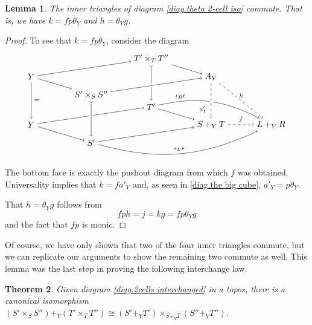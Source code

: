 \documentclass[11pt]{amsart}
\newtheorem{thm}{Theorem}[section]
\newtheorem{lem}[thm]{Lemma}
\theoremstyle{remark}
\theoremstyle{definition}
\begin{document}
\begin{lem}
	The inner triangles of diagram \eqref{diag.theta 2-cell iso} commute. That is, we have $k=fp \theta_Y$ and $h=\theta_Yg$.
\end{lem}
%
\begin{proof}
	To see that $k=fp\theta_Y$, consider the diagram
	\[
	\begin{tikzpicture}
		\node (Yt) at (0,2) {$Y$};
		\node (Yb) at (0,0) {$Y$};
		\node (Spb) at (2.5,1.25) {$S'\times_SS''$};
		\node (S') at (2.5,-0.75) {$S'$};
		\node (Tpb) at (5,2.75) {$T'\times_TT''$};
		\node (T') at (5,0.75) {$T'$};
		\node (Ay) at (7.5,2) {$A_Y$};
		\node (SyT) at (7.5,0) {$S+_YT$};
		\node (LyR) at (10,0) {$L+_YR$};
		\draw [->] (Yt) edge[] (Tpb);
		\draw [->] (Yt) edge[] (Spb);
		\draw [font=\scriptsize,->] (Yt) edge node[right] {$=$} (Yb);
		\draw [->] (Yb) edge[] (T');
		\draw [->] (Yb) edge[] (S');
		\draw [->] (Tpb) edge[] (Ay);
		\draw [>->] (Tpb) edge[] (T');
		\draw [font=\scriptsize,->] (Ay) edge[dashed] node[above] {$k$} (LyR);
		\draw [->] (S') edge[] (SyT);
		\draw [font=\scriptsize,->] (S') edge[bend right=20] node[above] {$\iota_Ls$} (LyR);
		\draw [font=\scriptsize,->] (T') edge[bend left=20] node[above,pos=.2] {$\iota_Rt$} (LyR);
		\draw [->] (T') edge[] (SyT);
		\draw [font=\scriptsize,->] (SyT) edge[dashed] node[above] {$f$} (LyR);
		\draw [->] (Spb) edge[white,line width=4pt] (Ay);
		\draw [->] (Spb) edge[] (Ay);
		\draw [>->] (Spb) edge[white,line width=4pt] (S');
		\draw [>->] (Spb) edge[] (S');
		\draw [->] (Ay) edge[white,line width=4pt] (SyT);
		\draw [font=\scriptsize,->] (Ay) edge[dashed] node[pos=0.75,left] {$a'_Y$} (SyT);
	\end{tikzpicture}
	\]
	The bottom face is exactly the pushout diagram from which $f$ was obtained.  Universality implies that $k = f a'_Y$ and, as seen in \eqref{diag.the big cube}, $a'_Y = p \theta_Y$. 
	
	That $h=\theta_Yg$ follows from 
	\[
		fph=j=kg=fp\theta_Yg
	\] 
	and the fact that $fp$ is monic.
\end{proof}


%
%
%
%
%

Of course, we have only shown that two of the four inner triangles commute, but we can replicate our arguments to show the remaining two commute as well.  This lemma was the last step in proving the following interchange law.

\begin{thm}
	\label{thm.interchange law}
	Given diagram \eqref{diag.2cells interchanged} in a topos, there is a canonical isomorphism $(S' \times_S S'') +_Y (T' \times_T T'') \cong (S' +_Y T') \times_{S +_Y T} ( S'' +_Y T'')$.
\end{thm}
\end{document}
